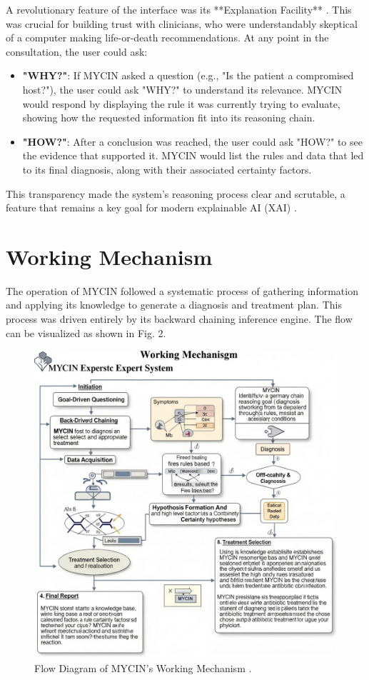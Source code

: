 \documentclass[conference]{IEEEtran}
\begin{document}
A revolutionary feature of the interface was its **Explanation Facility** \cite{b27}. This was crucial for building trust with clinicians, who were understandably skeptical of a computer making life-or-death recommendations. At any point in the consultation, the user could ask:
\begin{itemize}
    \item \textbf{"WHY?"}: If MYCIN asked a question (e.g., "Is the patient a compromised host?"), the user could ask "WHY?" to understand its relevance. MYCIN would respond by displaying the rule it was currently trying to evaluate, showing how the requested information fit into its reasoning chain.
    \item \textbf{"HOW?"}: After a conclusion was reached, the user could ask "HOW?" to see the evidence that supported it. MYCIN would list the rules and data that led to its final diagnosis, along with their associated certainty factors.
\end{itemize}
This transparency made the system's reasoning process clear and scrutable, a feature that remains a key goal for modern explainable AI (XAI) \cite{b28}.

\section{Working Mechanism}
The operation of MYCIN followed a systematic process of gathering information and applying its knowledge to generate a diagnosis and treatment plan. This process was driven entirely by its backward chaining inference engine. The flow can be visualized as shown in Fig. 2.

\begin{figure}[htbp]
\centerline{\includegraphics[width=0.9\columnwidth]{image/workings.jpeg}}
\caption{Flow Diagram of MYCIN's Working Mechanism \cite{b6}.}
\label{fig2}
\end{figure}
\end{document}
